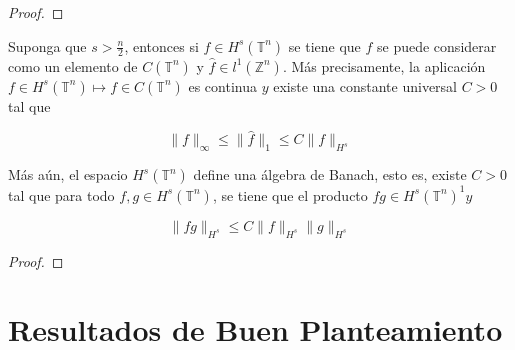 \documentclass[12pt]{article}
\begin{document}
\begin{proof}
\end{proof}

\begin{theorem}\label{algebra}
Suponga que $s>\frac{n}{2}$, entonces si $f \in H^s\left(\mathbb{T}^n\right)$ se tiene que $f$ se puede considerar como un elemento de $C\left(\mathbb{T}^n\right)$ y $\widehat{f} \in l^1\left(\mathbb{Z}^n\right)$. Más precisamente, la aplicación $f \in H^s\left(\mathbb{T}^n\right) \mapsto f \in C\left(\mathbb{T}^n\right)$ es continua $y$ existe una constante universal $C>0$ tal que

$$
\|f\|_{\infty} \leq\|\widehat{f}\|_1 \leq C\|f\|_{H^s}
$$


Más aún, el espacio $H^s\left(\mathbb{T}^n\right)$ define una álgebra de Banach, esto es, existe $C>0$ tal que para todo $f, g \in H^s\left(\mathbb{T}^n\right)$, se tiene que el producto $f g \in H^s\left(\mathbb{T}^n\right)^1 y$

$$
\|f g\|_{H^s} \leq C\|f\|_{H^s}\|g\|_{H^s}
$$
\end{theorem}

\begin{proof}
\lipsum[1]
\end{proof}


\section{Resultados de Buen Planteamiento}

\newpage



\nocite{*}
\end{document}
